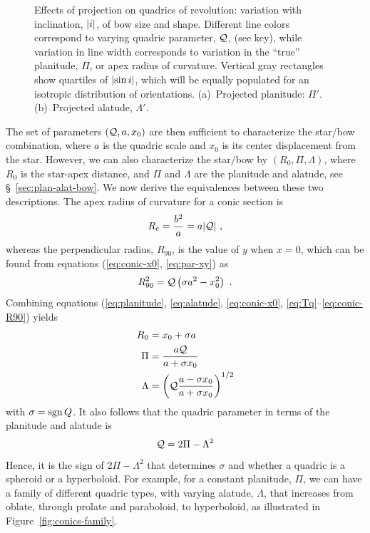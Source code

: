 \begin{figure}
\begin{tabular}{@{}ll@{}}
  \end{tabular}
  \caption[]{Effects of projection on quadrics of revolution:
    variation with inclination, \(\lvert i\rvert\), of bow size and shape.
    Different line colors correspond to varying quadric parameter,
    \(\mathcal{Q}\), (see key), while variation in line width corresponds to
    variation in the ``true'' planitude, \(\Pi\), or apex radius of
    curvature. Vertical gray rectangles show quartiles of
    \(\lvert\sin i\rvert\), which will be equally populated for an isotropic
    distribution of orientations. (a)~Projected planitude:
    \(\Pi'\). (b)~Projected alatude, \(\Lambda'\).}
  \label{fig:quadric-projection}
\end{figure}

The set of parameters \((\mathcal{Q}, a, x_0)\) are then sufficient to
characterize the star/bow combination, where \(a\) is the quadric
scale and \(x_0\) is its center displacement from the star.  However,
we can also characterize the star/bow by \((R_0, \Pi, \Lambda)\), where
\(R_0\) is the star-apex distance, and \(\Pi\) and \(\Lambda\) are the
planitude and alatude, see \S~\ref{sec:plan-alat-bow}.  We now derive
the equivalences between these two descriptions.  The apex radius of
curvature for a conic section is
\begin{equation}
  \label{eq:Rc-conic}
  R_c = \frac{b^2}{a} = a \lvert\mathcal{Q}\rvert\ ,
\end{equation}
whereas the perpendicular radius, \(R_{90}\), is the value of \(y\)
when \(x = 0\), which can be found from equations (\ref{eq:conic-x0},
\ref{eq:par-xy}) as
\begin{equation}
  \label{eq:conic-R90}
  R_{90}^2 = \mathcal{Q} \left(\sigma a^2 - x_0^2\right) \ .
\end{equation}
Combining equations (\ref{eq:planitude}, \ref{eq:alatude},
\ref{eq:conic-x0}, \ref{eq:Tq}--\ref{eq:conic-R90}) yields
\begin{align}
  \label{eq:R0-from-Q-a-x0}
  R_0 &= x_0 + \sigma a  \\
  \label{eq:Pi-from-Q-a-x0}
  \Pi &= \frac{a \mathcal{Q}}{a + \sigma x_0} \\
  \label{eq:Lambda-from-Q-a-x0}
  \Lambda &= \left( \mathcal{Q} \frac{a - \sigma x_0} {a + \sigma x_0}  \right)^{1/2}
\end{align}
with \(\sigma = \operatorname{sgn} Q\).  It also follows that the quadric parameter in
terms of the planitude and alatude is
\begin{equation}
  \label{eq:Tq-from-Pi-Lambda}
  \mathcal{Q} = 2 \Pi - \Lambda^2 
\end{equation}
Hence, it is the sign of \(2 \Pi - \Lambda^2\) that determines
\(\sigma\) and whether a quadric is a spheroid or a hyperboloid.  For
example, for a constant planitude, \(\Pi\), we can have a family of
different quadric types, with varying alatude, \(\Lambda\), that increases
from oblate, through prolate and paraboloid, to hyperboloid, as
illustrated in Figure~\ref{fig:conics-family}.


